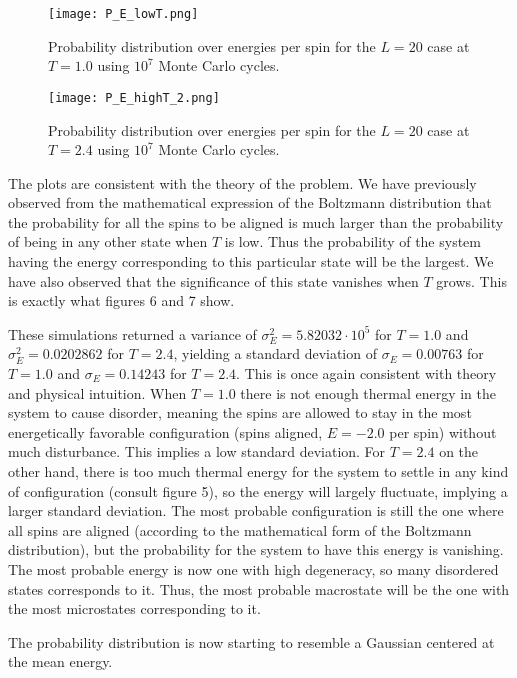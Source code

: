 \documentclass[english, 12pt]{article}
\begin{document}
\begin{figure}[hbt!]
\centering
\texttt{[image: P\_E\_lowT.png]}
\caption{Probability distribution over energies per spin for the $L=20$ case at $T=1.0$ using $10^7$ Monte Carlo cycles.}
\end{figure}

\begin{figure}[hbt!]
\centering
\texttt{[image: P\_E\_highT\_2.png]}
\caption{Probability distribution over energies per spin for the $L=20$ case at $T=2.4$ using $10^7$ Monte Carlo cycles.}
\end{figure}


The plots are consistent with the theory of the problem. We have previously observed from the mathematical expression of the Boltzmann distribution that the probability for all the spins to be aligned is much larger than the probability of being in any other state when $T$ is low. Thus the probability of the system having the energy corresponding to this particular state will be the largest. We have also observed that the significance of this state vanishes when $T$ grows. This is exactly what figures 6 and 7 show.

These simulations returned a variance of $\sigma_E^2 = 5.82032\cdot 10^5$ for $T=1.0$ and $\sigma_E^2 = 0.0202862$ for $T=2.4$, yielding a standard deviation of $\sigma_E = 0.00763$ for $T=1.0$ and $\sigma_E = 0.14243$ for $T=2.4$. This is once again consistent with theory and physical intuition. When $T=1.0$ there is not enough thermal energy in the system to cause disorder, meaning the spins are allowed to stay in the most energetically favorable configuration (spins aligned, $E=-2.0$ per spin) without much disturbance. This implies a low standard deviation. For $T=2.4$ on the other hand, there is too much thermal energy for the system to settle in any kind of configuration (consult figure 5), so the energy will largely fluctuate, implying a larger standard deviation. The most probable configuration is still the one where all spins are aligned (according to the mathematical form of the Boltzmann distribution), but the probability for the system to have this energy is vanishing. The most probable energy is now one with high degeneracy, so many disordered states corresponds to it. Thus, the most probable macrostate will be the one with the most microstates corresponding to it.

The probability distribution is now starting to resemble a Gaussian centered at the mean energy.
\end{document}
